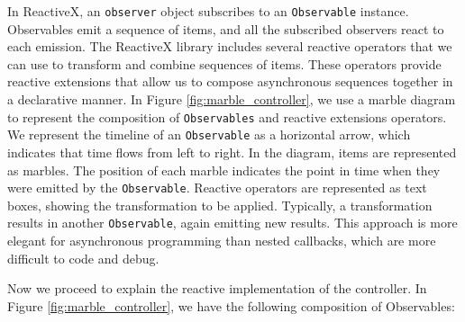 \documentclass[review]{elsarticle}
\begin{document}
In ReactiveX, an \texttt{observer} object subscribes to an \texttt{Observable} instance. 
Observables emit a sequence of items, and all the subscribed observers react to each emission. The
ReactiveX library includes several reactive operators that we can use to
transform and combine sequences of items. These operators provide reactive
extensions that allow us to compose asynchronous sequences together in a
declarative manner. In Figure \ref{fig:marble_controller}, we use a marble diagram to
represent the composition of \texttt{Observables} and reactive extensions operators. We
represent the timeline of an \texttt{Observable} as a horizontal arrow, which indicates
that time flows from left to right. In the diagram, items are represented as
marbles. The position of each marble indicates the point in time when they were
emitted by the \texttt{Observable}. Reactive operators are represented as text boxes,
showing the transformation to be applied. Typically, a transformation results in
another \texttt{Observable}, again emitting new results. This approach is more 
elegant for asynchronous programming than nested callbacks, which are more 
difficult to code and debug. 

Now we proceed to explain the reactive implementation of the controller.
In Figure \ref{fig:marble_controller}, we  have the following composition of Observables:
\end{document}
